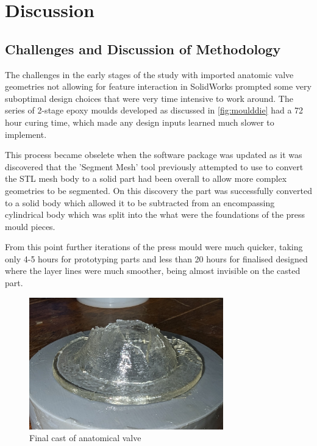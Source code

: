 \chapter{Discussion}\label{ch:Discussion}

\section{Challenges and Discussion of Methodology}

The challenges in the early stages of the study with imported anatomic valve geometries not allowing for feature interaction in SolidWorks prompted some very suboptimal design choices that were very time intensive to work around. The series of 2-stage epoxy moulds developed as discussed in \cref{fig:moulddie} had a 72 hour curing time, which made any design inputs learned much slower to implement.

This process became obselete when the software package was updated as it was discovered that the 'Segment Mesh' tool previously attempted to use to convert the STL mesh body to a solid part had been overall to allow more complex geometries to be segmented. On this discovery the part was successfully converted to a solid body which allowed it to be subtracted from an encompassing cylindrical body which was split into the what were the foundations of the press mould pieces.

From this point further iterations of the press mould were much quicker, taking only 4-5 hours for prototyping parts and less than 20 hours for finalised designed where the layer lines were much smoother, being almost invisible on the casted part.
\begin{figure}[H]
    \centering
    \includegraphics[width=0.75\textwidth]{figures/latercastnice.jpg}
    \caption{Final cast of anatomical valve}
    \label{fig:cast1}
\end{figure}

